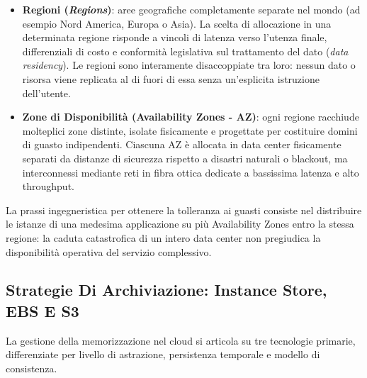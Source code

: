 \documentclass[11pt, a4paper]{article}
\begin{document}

\begin{itemize}
    \item \textbf{Regioni (\emph{Regions})}: aree geografiche completamente separate nel mondo (ad esempio Nord America, Europa o Asia). La scelta di allocazione in una determinata regione risponde a vincoli di latenza verso l'utenza finale, differenziali di costo e conformità legislativa sul trattamento del dato (\emph{data residency}). Le regioni sono interamente disaccoppiate tra loro: nessun dato o risorsa viene replicata al di fuori di essa senza un'esplicita istruzione dell'utente.
    \item \textbf{Zone di Disponibilità (\textbf{Availability Zones} - AZ)}: ogni regione racchiude molteplici zone distinte, isolate fisicamente e progettate per costituire domini di guasto indipendenti. Ciascuna AZ è allocata in data center fisicamente separati da distanze di sicurezza rispetto a disastri naturali o blackout, ma interconnessi mediante reti in fibra ottica dedicate a bassissima latenza e alto throughput.
\end{itemize}
La prassi ingegneristica per ottenere la tolleranza ai guasti consiste nel distribuire le istanze di una medesima applicazione su più Availability Zones entro la stessa regione: la caduta catastrofica di un intero data center non pregiudica la disponibilità operativa del servizio complessivo.

\subsection{Strategie Di Archiviazione: Instance Store, EBS E S3}

La gestione della memorizzazione nel cloud si articola su tre tecnologie primarie, differenziate per livello di astrazione, persistenza temporale e modello di consistenza.

\end{document}
